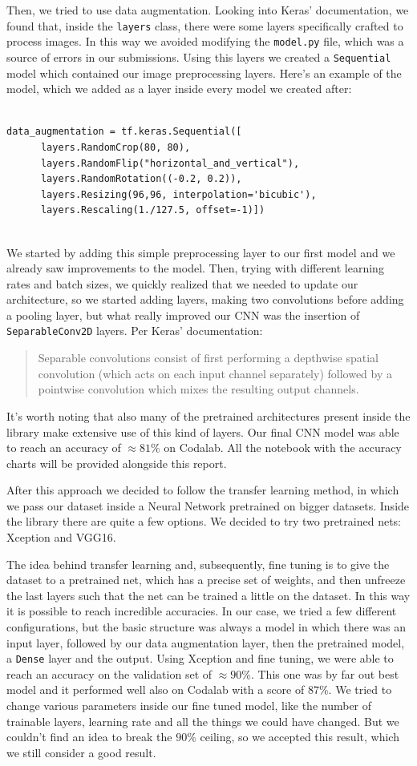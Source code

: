 \documentclass[a4paper,12pt]{article}
\newcommand{\code}[1]{\texttt{#1}}
\numberwithin{equation}{section}
\begin{document}
Then, we tried to use data augmentation. Looking into Keras' documentation, we found that, inside the \code{layers} class, there were some layers specifically crafted to process images. In this way we avoided modifying the \code{model.py} file, which was a source of errors in our submissions. Using this layers we created a \code{Sequential} model which contained our image preprocessing layers. Here's an example of the model, which we added as a layer inside every model we created after:
\begin{verbatim}
    
data_augmentation = tf.keras.Sequential([
      layers.RandomCrop(80, 80),
      layers.RandomFlip("horizontal_and_vertical"),
      layers.RandomRotation((-0.2, 0.2)),
      layers.Resizing(96,96, interpolation='bicubic'),
      layers.Rescaling(1./127.5, offset=-1)])
  
\end{verbatim}
We started by adding this simple preprocessing layer to our first model and we already saw improvements to the model. Then, trying with different learning rates and batch sizes, we quickly realized that we needed to update our architecture, so we started adding layers, making two convolutions before adding a pooling layer, but what really improved our CNN was the insertion of \code{SeparableConv2D} layers. Per Keras' documentation:
\begin{quote}
      Separable convolutions consist of first performing a depthwise spatial convolution (which acts on each input channel separately) followed by a pointwise convolution which mixes the resulting output channels.
\end{quote}
It's worth noting that also many of the pretrained architectures present inside the library make extensive use of this kind of layers. Our final CNN model was able to reach an accuracy of \(\approx 81\%\) on Codalab. All the notebook with the accuracy charts will be provided alongside this report.

After this approach we decided to follow the transfer learning method, in which we pass our dataset inside a Neural Network pretrained on bigger datasets. Inside the library there are quite a few options. We decided to try two pretrained nets: Xception and VGG16. 

The idea behind transfer learning and, subsequently, fine tuning is to give the dataset to a pretrained net, which has a precise set of weights, and then unfreeze the last layers such that the net can be trained a little on the dataset. In this way it is possible to reach incredible accuracies. In our case, we tried a few different configurations, but the basic structure was always a model in which there was an input layer, followed by our data augmentation layer, then the pretrained model, a \code{Dense} layer and the output. Using Xception and fine tuning, we were able to reach an accuracy on the validation set of \(\approx 90\%\). This one was by far out best model and it performed well also on Codalab with a score of \(87\%\). We tried to change various parameters inside our fine tuned model, like the number of trainable layers, learning rate and all the things we could have changed. But we couldn't find an idea to break the \(90\%\) ceiling, so we accepted this result, which we still consider a good result.
\end{document}
